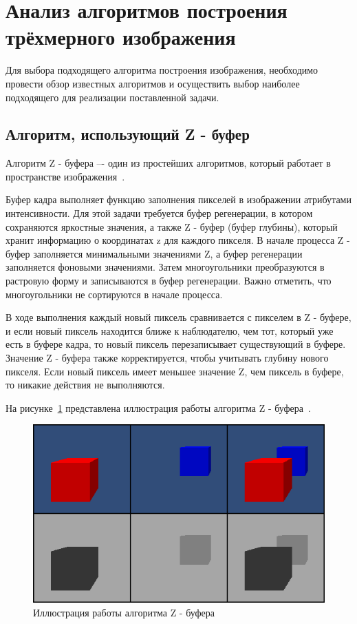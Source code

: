 \section{Анализ алгоритмов построения трёхмерного изображения}

Для выбора подходящего алгоритма построения изображения, необходимо
провести обзор известных алгоритмов и осуществить выбор наиболее
подходящего для реализации поставленной задачи.

\subsection{Алгоритм, использующий Z - буфер}

Алгоритм Z - буфера –- один из простейших алгоритмов, который работает в пространстве изображения~\cite{rodgers}.

Буфер кадра выполняет функцию заполнения пикселей в изображении атрибутами интенсивности. 
Для этой задачи требуется буфер регенерации, в котором сохраняются яркостные значения, а также Z - буфер (буфер глубины), который хранит информацию о координатах z для каждого пикселя. 
В начале процесса Z - буфер заполняется минимальными значениями Z, а буфер регенерации заполняется фоновыми значениями. 
Затем многоугольники преобразуются в растровую форму и записываются в буфер регенерации. 
Важно отметить, что многоугольники не сортируются в начале процесса.

В ходе выполнения каждый новый пиксель сравнивается с пикселем в Z - буфере, и если новый пиксель находится ближе к наблюдателю, чем тот, который уже есть в буфере кадра, то новый пиксель перезаписывает существующий в буфере. 
Значение Z - буфера также корректируется, чтобы учитывать глубину нового пикселя. 
Если новый пиксель имеет меньшее значение Z, чем пиксель в буфере, то никакие действия не выполняются.

На рисунке~\ref{fig:z_buffer} представлена иллюстрация работы алгоритма Z - буфера~\cite{z_buffer}.
\begin{figure}[h]
	\begin{center}
		\includegraphics[width=\linewidth]{photos/z_buffer2.png}
	\end{center}
	\caption{Иллюстрация работы алгоритма Z - буфера}
	\label{fig:z_buffer}
\end{figure}

